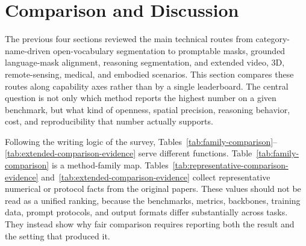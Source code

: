 \section{Comparison and Discussion}
\label{sec:comparison-discussion}

The previous four sections reviewed the main technical routes from category-name-driven open-vocabulary segmentation to promptable masks, grounded language-mask alignment, reasoning segmentation, and extended video, 3D, remote-sensing, medical, and embodied scenarios. This section compares these routes along capability axes rather than by a single leaderboard. The central question is not only which method reports the highest number on a given benchmark, but what kind of openness, spatial precision, reasoning behavior, cost, and reproducibility that number actually supports.

Following the writing logic of the survey, Tables~\ref{tab:family-comparison}--\ref{tab:extended-comparison-evidence} serve different functions. Table~\ref{tab:family-comparison} is a method-family map. Tables~\ref{tab:representative-comparison-evidence} and~\ref{tab:extended-comparison-evidence} collect representative numerical or protocol facts from the original papers. These values should not be read as a unified ranking, because the benchmarks, metrics, backbones, training data, prompt protocols, and output formats differ substantially across tasks. They instead show why fair comparison requires reporting both the result and the setting that produced it.

